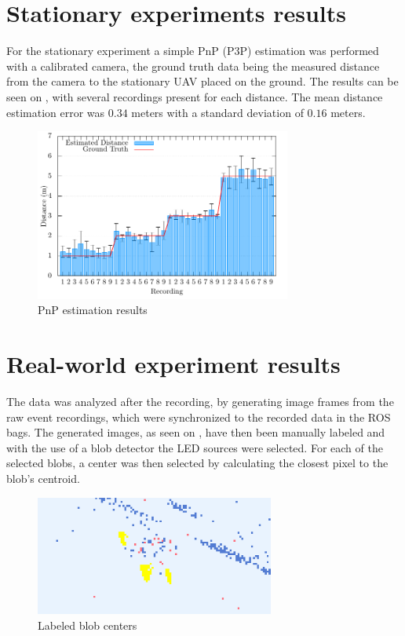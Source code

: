 \section{Stationary experiments results}
For the stationary experiment a simple
\ac{PnP} (\ac{P3P}) estimation was performed with a calibrated camera, the ground truth data being the measured distance from the camera to the
stationary \ac{UAV} placed on the ground.
The results can be seen on , with several recordings
present for each distance. The mean distance estimation error was $0.34$ meters with a standard deviation of $0.16$ meters.
\begin{figure}[H]
	\centering
	\includegraphics[width=0.75\textwidth]{./fig/tikz/pnp_results.pdf}
	\caption{PnP estimation results}
	\label{fig:pnpres}
\end{figure}

\section{Real-world experiment results}

The data was analyzed after the recording, by generating image frames from the raw event recordings, which
were synchronized to the recorded data in the ROS bags.
The generated images, as seen on , have then been manually labeled and with the use of a blob detector
the \ac{LED} sources
were selected. For each of the selected blobs, a center was then selected by calculating the closest pixel to the
blob's centroid.

\begin{figure}[H]
	\centering
	\includegraphics[width=0.7\textwidth]{./fig/photos/labeled_2.png}
	\caption{Labeled blob centers}
	\label{fig:labeled}
\end{figure}


